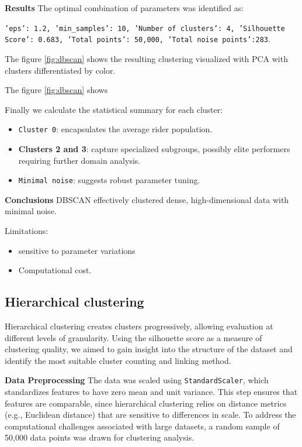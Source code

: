 \documentclass[a4paper, twoside]{article}
\begin{document}
\textbf{Results}
The optimal combination of parameters was identified as:
\begin{center}
    \texttt{'eps': 1.2, 'min\_samples': 10, 'Number of clusters': 4, 'Silhouette Score': 0.683, 'Total points': 50,000, 'Total noise points':283}.
\end{center}
The figure \ref{fig:dbscan} shows the resulting clustering visualized with PCA with clusters differentiated by color.

The figure \ref{fig:dbscan} shows 

Finally we calculate the statistical summary for each cluster:
\begin{itemize}[noitemsep]
    \item \texttt{Cluster 0}: encapsulates the average rider population.
    
    \item \textbf{Clusters 2 and 3}: capture specialized subgroups, possibly elite performers requiring further domain analysis.

    \item \texttt{Minimal noise}: suggests robust parameter tuning.

\end{itemize}

\textbf{Conclusions}
DBSCAN effectively clustered dense, high-dimensional data with minimal noise.

Limitations:
\begin{itemize}[noitemsep]
    \item sensitive to parameter variations
    \item Computational cost.
\end{itemize}

\subsection{Hierarchical clustering}

Hierarchical clustering creates clusters progressively, allowing evaluation at different levels of granularity. Using the silhouette score as a measure of clustering quality, we aimed to gain insight into the structure of the dataset and identify the most suitable cluster counting and linking method.

\textbf{Data Preprocessing}
The data was scaled using \texttt{StandardScaler}, which standardizes features to have zero mean and unit variance. This step ensures that features are comparable, since hierarchical clustering relies on distance metrics (e.g., Euclidean distance) that are sensitive to differences in scale.
To address the computational challenges associated with large datasets, a random sample of 50,000 data points was drawn for clustering analysis.
\end{document}
